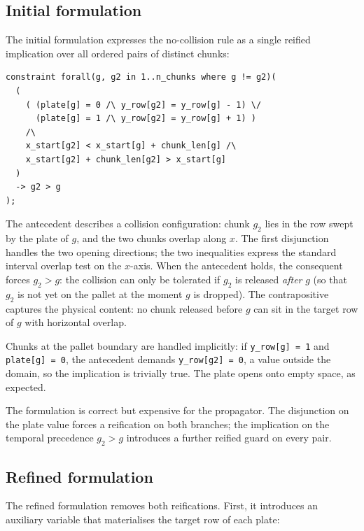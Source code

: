 \subsection{Initial formulation}

The initial formulation expresses the no-collision rule as a single reified
implication over all ordered pairs of distinct chunks:

\vspace{0.5cm}
\begin{lstlisting}
constraint forall(g, g2 in 1..n_chunks where g != g2)(
  (
    ( (plate[g] = 0 /\ y_row[g2] = y_row[g] - 1) \/
      (plate[g] = 1 /\ y_row[g2] = y_row[g] + 1) )
    /\
    x_start[g2] < x_start[g] + chunk_len[g] /\
    x_start[g2] + chunk_len[g2] > x_start[g]
  )
  -> g2 > g
);
\end{lstlisting}
\vspace{0.5cm}

The antecedent describes a collision configuration: chunk \(g_2\) lies in
the row swept by the plate of \(g\), and the two chunks overlap along
\(x\). The first disjunction handles the two opening directions; the two
inequalities express the standard interval overlap test on the
\(x\)-axis. When the antecedent holds, the consequent forces
\(g_2 > g\): the collision can only be tolerated if \(g_2\) is released
\emph{after} \(g\) (so that \(g_2\) is not yet on the pallet at the
moment \(g\) is dropped). The contrapositive captures the physical content:
no chunk released before \(g\) can sit in the target row of \(g\) with
horizontal overlap.

Chunks at the pallet boundary are handled implicitly: if
\texttt{y\_row[g] = 1} and \texttt{plate[g] = 0}, the antecedent demands
\texttt{y\_row[g2] = 0}, a value outside the domain, so the implication is
trivially true. The plate opens onto empty space, as expected.

The formulation is correct but expensive for the propagator. The
disjunction on the plate value forces a reification on both branches; the
implication on the temporal precedence \(g_2 > g\) introduces a further
reified guard on every pair.

\subsection{Refined formulation}

The refined formulation removes both reifications. First, it introduces an
auxiliary variable that materialises the target row of each plate:

